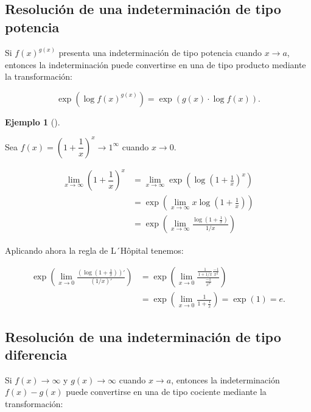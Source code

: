 \documentclass[
  a4paper,
]{scrreport}
\theoremstyle{plain}
\theoremstyle{definition}
\theoremstyle{plain}
\theoremstyle{plain}
\theoremstyle{definition}
\newtheorem{example}{Ejemplo}[chapter]
\theoremstyle{definition}
\theoremstyle{remark}
\begin{document}
\subsection{Resolución de una indeterminación de tipo
potencia}\label{resoluciuxf3n-de-una-indeterminaciuxf3n-de-tipo-potencia}

Si \(f(x)^{g(x)}\) presenta una indeterminación de tipo potencia cuando
\(x\to a\), entonces la indeterminación puede convertirse en una de tipo
producto mediante la transformación:

\[\exp\left(\log f(x)^{g(x)}\right) = \exp\left(g(x)\cdot \log f(x)\right).\]

\begin{example}[]\protect\hypertarget{exm-solucion-indeterminacion-producto}{}\label{exm-solucion-indeterminacion-producto}

Sea \(f(x)=\left(1+\dfrac{1}{x}\right)^{x} \to 1^\infty\) cuando
\(x\to 0\).

\begin{align*}
\lim_{x\to \infty}\left(1+\dfrac{1}{x}\right)^{x} 
&= \lim_{x\to \infty}\exp\left(\log\left(1+\frac{1}{x}\right)^{x}\right)\\ 
&= \exp\left(\lim_{x\to \infty}x\log\left(1+\frac{1}{x}\right)\right)\\
&= \exp\left(\lim_{x\to \infty}\frac{\log\left(1+\frac{1}{x}\right)}{1/x}\right)
\end{align*}

Aplicando ahora la regla de L´Hôpital tenemos:

\begin{align*}
\exp\left(\lim_{x\to 0}\frac{\left(\log\left(1+\frac{1}{x}\right)\right)'}{\left(1/x\right)'}\right) &=
\exp\left(\lim_{x\to 0}\frac{\frac{1}{1+1/x}\frac{-1}{x^2}}{\frac{-1}{x^2}}\right) \\ 
&=
\exp\left(\lim_{x\to 0}\frac{1}{1+\frac{1}{x}}\right)=\exp(1)=e.
\end{align*}

\end{example}

\subsection{Resolución de una indeterminación de tipo
diferencia}\label{resoluciuxf3n-de-una-indeterminaciuxf3n-de-tipo-diferencia}

Si \(f(x)\to \infty\) y \(g(x)\to \infty\) cuando \(x\to a\), entonces
la indeterminación \(f(x)-g(x)\) puede convertirse en una de tipo
cociente mediante la transformación:
\end{document}
